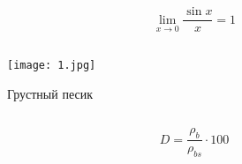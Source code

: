 \documentclass[12pt, a4paper]{article}
\begin{document}
\subsection{}
\newcommand{\llim}{\lim\limits}
\begin{equation}
\llim_{x \to 0} \frac{\sin{x}}{x} = 1
\end{equation}
\subsection{}
\renewcommand{\thefigure}{\arabic{section}:\arabic{figure}}
\begin{figure}[H] 
\texttt{[image: 1.jpg]}
\caption{Грустный песик}
\end{figure}
\subsection{}
\begin{equation}
D=\frac{\rho_b}{\rho_{bs}}\cdot100
\end{equation}
\end{document}
